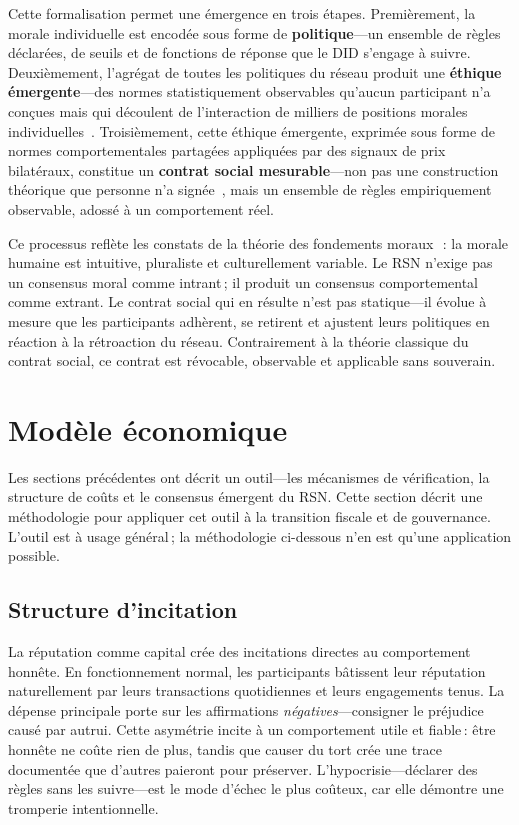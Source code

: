 \documentclass[11pt,a4paper,twocolumn]{article}
\begin{document}
Cette formalisation permet une émergence en trois étapes. Premièrement, la morale individuelle est encodée sous forme de \textbf{politique}---un ensemble de règles déclarées, de seuils et de fonctions de réponse que le DID s'engage à suivre. Deuxièmement, l'agrégat de toutes les politiques du réseau produit une \textbf{éthique émergente}---des normes statistiquement observables qu'aucun participant n'a conçues mais qui découlent de l'interaction de milliers de positions morales individuelles~\cite{durkheim1893}. Troisièmement, cette éthique émergente, exprimée sous forme de normes comportementales partagées appliquées par des signaux de prix bilatéraux, constitue un \textbf{contrat social mesurable}---non pas une construction théorique que personne n'a signée~\cite{rawls1971}, mais un ensemble de règles empiriquement observable, adossé à un comportement réel.

Ce processus reflète les constats de la théorie des fondements moraux~\cite{haidt2012}\,: la morale humaine est intuitive, pluraliste et culturellement variable. Le RSN n'exige pas un consensus moral comme intrant\,; il produit un consensus comportemental comme extrant. Le contrat social qui en résulte n'est pas statique---il évolue à mesure que les participants adhèrent, se retirent et ajustent leurs politiques en réaction à la rétroaction du réseau. Contrairement à la théorie classique du contrat social, ce contrat est révocable, observable et applicable sans souverain.

\section{Modèle économique}

Les sections précédentes ont décrit un outil---les mécanismes de vérification, la structure de coûts et le consensus émergent du RSN. Cette section décrit une méthodologie pour appliquer cet outil à la transition fiscale et de gouvernance. L'outil est à usage général\,; la méthodologie ci-dessous n'en est qu'une application possible.

\subsection{Structure d'incitation}

La réputation comme capital crée des incitations directes au comportement honnête. En fonctionnement normal, les participants bâtissent leur réputation naturellement par leurs transactions quotidiennes et leurs engagements tenus. La dépense principale porte sur les affirmations \emph{négatives}---consigner le préjudice causé par autrui. Cette asymétrie incite à un comportement utile et fiable\,: être honnête ne coûte rien de plus, tandis que causer du tort crée une trace documentée que d'autres paieront pour préserver. L'hypocrisie---déclarer des règles sans les suivre---est le mode d'échec le plus coûteux, car elle démontre une tromperie intentionnelle.
\end{document}

